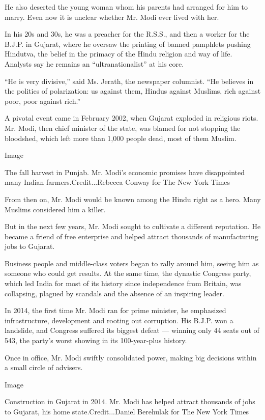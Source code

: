 He also deserted the young woman whom his parents had arranged for him
to marry. Even now it is unclear whether Mr. Modi ever lived with her.

In his 20s and 30s, he was a preacher for the R.S.S., and then a worker
for the B.J.P. in Gujarat, where he oversaw the printing of banned
pamphlets pushing Hindutva, the belief in the primacy of the Hindu
religion and way of life. Analysts say he remains an
``ultranationalist'' at his core.

``He is very divisive,'' said Ms. Jerath, the newspaper columnist. ``He
believes in the politics of polarization: us against them, Hindus
against Muslims, rich against poor, poor against rich.''

A pivotal event came in February 2002, when Gujarat exploded in
religious riots. Mr. Modi, then chief minister of the state, was blamed
for not stopping the bloodshed, which left more than 1,000 people dead,
most of them Muslim.

Image

The fall harvest in Punjab. Mr. Modi's economic promises have
disappointed many Indian farmers.Credit...Rebecca Conway for The New
York Times

From then on, Mr. Modi would be known among the Hindu right as a hero.
Many Muslims considered him a killer.

But in the next few years, Mr. Modi sought to cultivate a different
reputation. He became a friend of free enterprise and helped attract
thousands of manufacturing jobs to Gujarat.

Business people and middle-class voters began to rally around him,
seeing him as someone who could get results. At the same time, the
dynastic Congress party, which led India for most of its history since
independence from Britain, was collapsing, plagued by scandals and the
absence of an inspiring leader.

In 2014, the first time Mr. Modi ran for prime minister, he emphasized
infrastructure, development and rooting out corruption. His B.J.P. won a
landslide, and Congress suffered its biggest defeat --- winning only 44
seats out of 543, the party's worst showing in its 100-year-plus
history.

Once in office, Mr. Modi swiftly consolidated power, making big
decisions within a small circle of advisers.

Image

Construction in Gujarat in 2014. Mr. Modi has helped attract thousands
of jobs to Gujarat, his home state.Credit...Daniel Berehulak for The New
York Times


